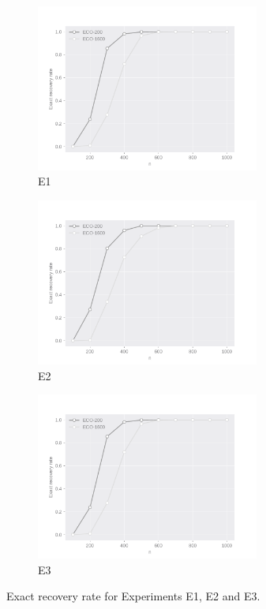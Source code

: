 \documentclass[11pt]{article}
\theoremstyle{definition}
\begin{document}
    \begin{figure}[!htp]
    
                \begin{subfigure}{.33\textwidth}
                  \centering
                  \includegraphics[width=.9\linewidth,height=5.5cm]{figure/exact_recov_rate_model_1.pdf}
                  \caption{E1}
                  \label{fig:sfig1_chap2}
                \end{subfigure}%
                \begin{subfigure}{.33\textwidth}
                  \centering
                  \includegraphics[width=.9\linewidth,height=5.5cm]{figure/exact_recov_rate_model_2.pdf}
                  \caption{E2}
                  \label{fig:sfig2_chap2}
                \end{subfigure}
                \begin{subfigure}{.33\textwidth}
                  \centering
                  \includegraphics[width=.9\linewidth,height=5.5cm]{figure/exact_recov_rate_model_3.pdf}
                  \caption{E3}
                  \label{fig:sfig3_chap2}
                \end{subfigure}%
                \hspace{\fill}
    	\caption{Exact recovery rate for Experiments E1, E2 and E3. }
    	\label{fig:exact_recov_rate}
	\end{figure}
	
\end{document}
